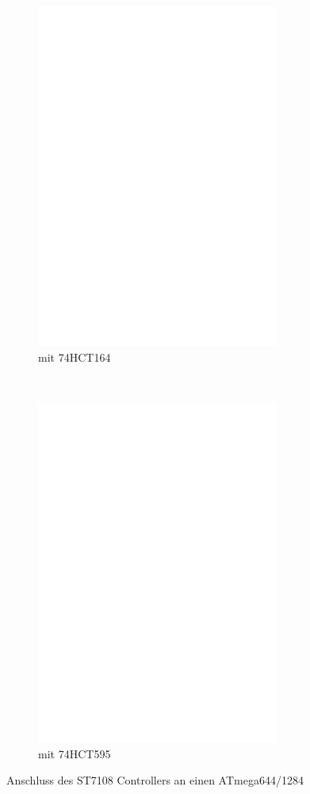 \begin{figure}[H]
  \begin{subfigure}[b]{9cm}
    \centering
    \includegraphics[width=8cm]{../FIG/ST7108serial164_644.eps}
    \caption{mit 74HCT164}
  \end{subfigure}
  ~
  \begin{subfigure}[b]{9cm}
    \centering
    \includegraphics[width=8cm]{../FIG/ST7108serial595_644.eps}
    \caption{mit 74HCT595}
  \end{subfigure}
  \caption{Anschluss des ST7108 Controllers an einen ATmega644/1284}
  \label{fig:ST7108lcd_644}
\end{figure}




